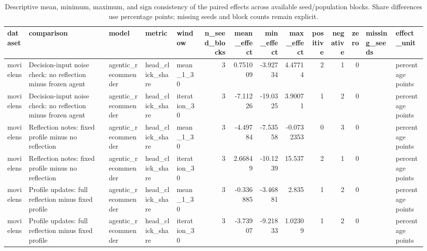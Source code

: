 \begin{table}[htbp!]
\centering
\small
\setlength{\tabcolsep}{3pt}
\renewcommand{\arraystretch}{1.1}
\begin{tabular}{lllllrrrrrrrll}
\hline
dataset & comparison & model & metric & window & n\_seed\_blocks & mean\_effect & min\_effect & max\_effect & positive & negative & zero & missing\_seeds & effect\_unit \\
\hline
movielens & Decision-input noise check: no reflection minus frozen agent & agentic\_recommender & head\_click\_share & mean\_1\_30 & 3 & 0.751009 & -3.92734 & 4.47714 & 2 & 1 & 0 &  & percentage points \\
movielens & Decision-input noise check: no reflection minus frozen agent & agentic\_recommender & head\_click\_share & iteration\_30 & 3 & -7.11226 & -19.0325 & 3.90071 & 1 & 2 & 0 &  & percentage points \\
movielens & Reflection notes: fixed profile minus no reflection & agentic\_recommender & head\_click\_share & mean\_1\_30 & 3 & -4.49784 & -7.53558 & -0.0732353 & 0 & 3 & 0 &  & percentage points \\
movielens & Reflection notes: fixed profile minus no reflection & agentic\_recommender & head\_click\_share & iteration\_30 & 3 & 2.66849 & -10.1239 & 15.537 & 2 & 1 & 0 &  & percentage points \\
movielens & Profile updates: full reflection minus fixed profile & agentic\_recommender & head\_click\_share & mean\_1\_30 & 3 & -0.336885 & -3.46881 & 2.835 & 1 & 2 & 0 &  & percentage points \\
movielens & Profile updates: full reflection minus fixed profile & agentic\_recommender & head\_click\_share & iteration\_30 & 3 & -3.73907 & -9.21833 & 1.02309 & 1 & 2 & 0 &  & percentage points \\
\hline
\end{tabular}
\caption{Descriptive mean, minimum, maximum, and sign consistency of the paired effects across available seed/population blocks. Share differences use percentage points; missing seeds and block counts remain explicit.}
\label{chap:results:tab:rq3_seed_consistency_head_click_share}
\end{table}
